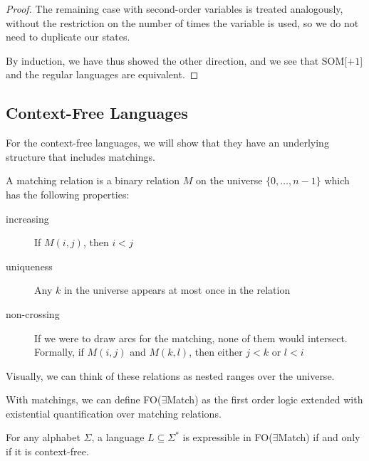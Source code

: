 \begin{proof}
    The remaining case with second-order variables is treated analogously, without the restriction on the number of times the variable is used, so we do not need to duplicate our states.

    By induction, we have thus showed the other direction, and we see that SOM[$+ 1$] and the regular languages are equivalent.
\end{proof}

\subsection{Context-Free Languages}\label{subsec:des-context-free-languages}

For the context-free languages, we will show that they have an underlying structure that includes matchings.

A matching relation is a binary relation $M$ on the universe $\{0, \dots, n - 1\}$ which has the following properties:
\begin{description}
    \item[increasing] If $M(i, j)$, then $i < j$
    \item[uniqueness] Any $k$ in the universe appears at most once in the relation
    \item[non-crossing] If we were to draw arcs for the matching, none of them would intersect.
    Formally, if $M(i, j)$ and $M(k, l)$, then either $j < k$ or $l < i$
\end{description}
Visually, we can think of these relations as nested ranges over the universe.

With matchings, we can define FO($\exists$Match) as the first order logic extended with existential quantification over matching relations.

\begin{theorem}
    For any alphabet $\Sigma$, a language $L \subseteq \Sigma^{*}$ is expressible in FO($\exists$Match) if and only if it is context-free.
\end{theorem}

